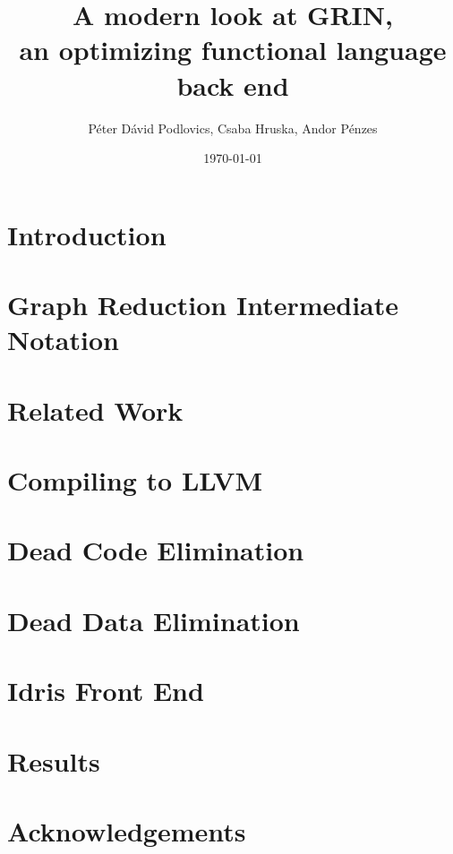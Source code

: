 \documentclass[10pt,a4paper,oneside]{article}
\title{\vspace{-2cm}A modern look at GRIN,\\ an optimizing functional language back end}
\date{\today}
\author{Péter Dávid Podlovics, Csaba Hruska, Andor Pénzes}
\begin{document}
	
	\maketitle
	
	
	\section{Introduction} \label{sec-intro}
	
	
	\section{Graph Reduction Intermediate Notation}
	
	
	\section{Related Work}
	
	
	\section{Compiling to LLVM}
	
	
	\section{Dead Code Elimination}
	
	
	\section{Dead Data Elimination} \label{sec:dde}
	
	
	\section{Idris Front End} \label{sec:idris-front-end}
	
	
	\section{Results}
	
	
	
	
	\section*{Acknowledgements}
	
	
	

	
\end{document}
